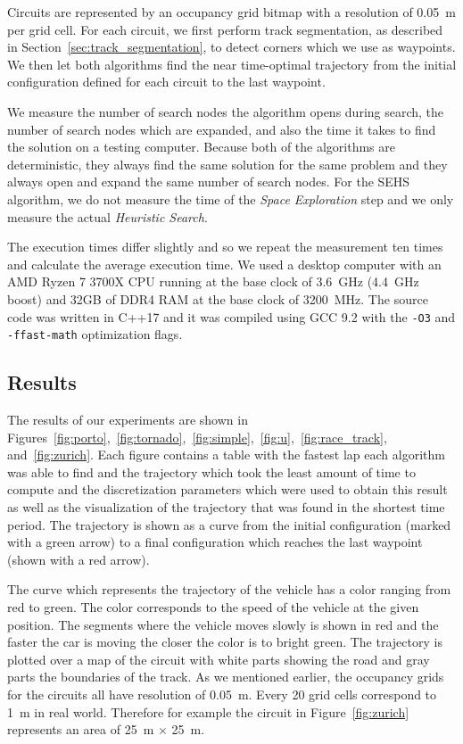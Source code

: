 Circuits are represented by an occupancy grid bitmap with a resolution of \SI{0.05}{\meter} per grid cell. For each circuit, we first perform track segmentation, as described in Section~\ref{sec:track_segmentation}, to detect corners which we use as waypoints. We then let both algorithms find the near time-optimal trajectory from the initial configuration defined for each circuit to the last waypoint.

We measure the number of search nodes the algorithm opens during search, the number of search nodes which are expanded, and also the time it takes to find the solution on a testing computer. Because both of the algorithms are deterministic, they always find the same solution for the same problem and they always open and expand the same number of search nodes. For the SEHS algorithm, we do not measure the time of the \textit{Space Exploration} step and we only measure the actual \textit{Heuristic Search}.

The execution times differ slightly and so we repeat the measurement ten times and calculate the average execution time. We used a desktop computer with an AMD Ryzen 7 3700X CPU running at the base clock of \SI{3.6}{\giga\hertz} (\SI{4.4}{\giga\hertz} boost) and \num{32}GB of DDR4 RAM at the base clock of \SI{3200}{\mega\hertz}. The source code was written in C++17 and it was compiled using GCC 9.2 with the \texttt{-O3} and \texttt{-ffast-math} optimization flags.

\subsection{Results}

The results of our experiments are shown in Figures~\ref{fig:porto},~\ref{fig:tornado},~\ref{fig:simple},~\ref{fig:u},~\ref{fig:race_track}, and~\ref{fig:zurich}. Each figure contains a table with the fastest lap each algorithm was able to find and the trajectory which took the least amount of time to compute and the discretization parameters which were used to obtain this result as well as the visualization of the trajectory that was found in the shortest time period. The trajectory is shown as a curve from the initial configuration (marked with a green arrow) to a final configuration which reaches the last waypoint (shown with a red arrow).

The curve which represents the trajectory of the vehicle has a color ranging from red to green. The color corresponds to the speed of the vehicle at the given position. The segments where the vehicle moves slowly is shown in red and the faster the car is moving the closer the color is to bright green. The trajectory is plotted over a map of the circuit with white parts showing the road and gray parts the boundaries of the track. As we mentioned earlier, the occupancy grids for the circuits all have resolution of \SI{0.05}{\meter}. Every \num{20} grid cells correspond to \SI{1}{\meter} in real world. Therefore for example the circuit in Figure~\ref{fig:zurich} represents an area of \SI{25}{\meter} $\times$ \SI{25}{\meter}.

